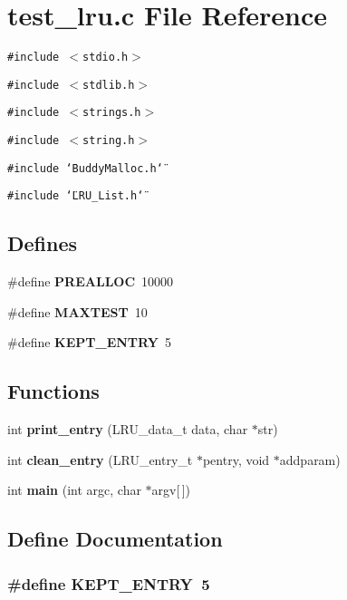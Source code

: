 \section{test\_\-lru.c File Reference}
\label{test__lru_8c}
{\tt \#include $<$stdio.h$>$}\par
{\tt \#include $<$stdlib.h$>$}\par
{\tt \#include $<$strings.h$>$}\par
{\tt \#include $<$string.h$>$}\par
{\tt \#include \char`\"{}Buddy\-Malloc.h\char`\"{}}\par
{\tt \#include \char`\"{}LRU\_\-List.h\char`\"{}}\par
\subsection*{Defines}
\begin{CompactItemize}
\item 
\#define {\bf PREALLOC}\ 10000
\item 
\#define {\bf MAXTEST}\ 10
\item 
\#define {\bf KEPT\_\-ENTRY}\ 5
\end{CompactItemize}
\subsection*{Functions}
\begin{CompactItemize}
\item 
int {\bf print\_\-entry} (LRU\_\-data\_\-t data, char $\ast$str)
\item 
int {\bf clean\_\-entry} (LRU\_\-entry\_\-t $\ast$pentry, void $\ast$addparam)
\item 
int {\bf main} (int argc, char $\ast$argv[$\,$])
\end{CompactItemize}


\subsection{Define Documentation}
\subsubsection{\setlength{\rightskip}{0pt plus 5cm}\#define KEPT\_\-ENTRY\ 5}\label{test__lru_8c_a2}




